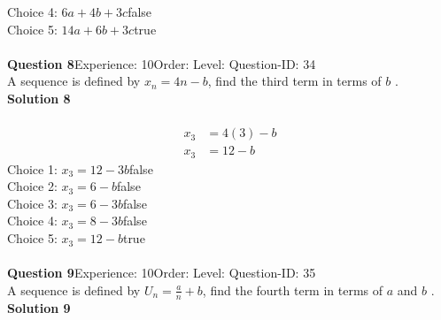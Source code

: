 \documentclass{article}
\begin{document}
Choice 4: \hspace{20pt}$6a+4b+3c$\hspace{20pt}false\\
Choice 5: \hspace{20pt}$14a+6b+3c$\hspace{20pt}true\\
\\[4pt]
\noindent\textbf{Question 8}\hspace{20pt}Experience: 10\hspace{20pt}Order: \hspace{20pt}Level: \hspace{20pt}Question-ID: 34\\[2pt]
A sequence is defined by $x_n=4n-b$, find the third term in terms of $b$ .\\[4pt]
\noindent\textbf{Solution 8}\\[2pt]
\\[-35pt]\begin{align*}
x_3&=4(3)-b\\
x_3&=12-b
\end{align*}
Choice 1: \hspace{20pt}$x_3=12-3b$\hspace{20pt}false\\
Choice 2: \hspace{20pt}$x_3=6-b$\hspace{20pt}false\\
Choice 3: \hspace{20pt}$x_3=6-3b$\hspace{20pt}false\\
Choice 4: \hspace{20pt}$x_3=8-3b$\hspace{20pt}false\\
Choice 5: \hspace{20pt}$x_3=12-b$\hspace{20pt}true\\
\\[4pt]
\noindent\textbf{Question 9}\hspace{20pt}Experience: 10\hspace{20pt}Order: \hspace{20pt}Level: \hspace{20pt}Question-ID: 35\\[2pt]
A sequence is defined by $U_n=\displaystyle\frac{a}{n}+b$, find the fourth term in terms of $a$ and $b$ .\\[4pt]
\noindent\textbf{Solution 9}\\[2pt]
\end{document}
